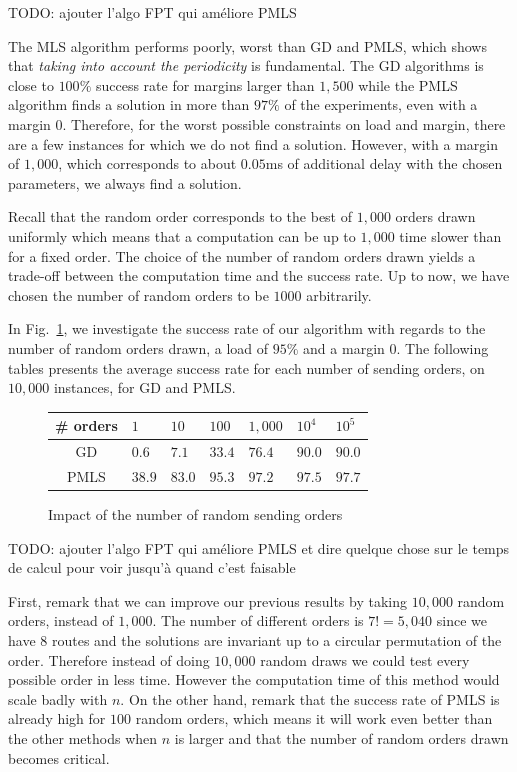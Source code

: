\documentclass[10pt, conference, letterpaper]{IEEEtran}
\newcommand{\todo}[1]{{\color{red} TODO: {#1}}}
\begin{document}
     \todo{ajouter l'algo FPT qui améliore PMLS}

     The MLS algorithm performs poorly, worst than GD and PMLS, which shows that \emph{taking into account the periodicity} is fundamental.
     The GD algorithms is close to $100\%$ success rate for margins larger than $1,500$ while the PMLS algorithm finds a solution in more than $97\%$ of the experiments, even with a margin $0$. Therefore, for the worst possible constraints on load and margin, there are a few instances for which we do not find a solution. However, with a margin of $1,000$, which corresponds to about $0.05$ms of additional delay with the chosen parameters, we always find a solution. 
     
    Recall that the random order corresponds to the best of $1,000$ orders drawn uniformly which means that a computation can be up to $1,000$ time slower than for a fixed order. The choice of the number of random orders drawn yields a trade-off between the computation time and the success rate. Up to now, we have chosen the number of random orders to be $1000$ arbitrarily.
    
    In Fig.~\ref{fig:randomdrawing}, we investigate the success rate of our algorithm with regards to the number of random orders drawn, a load of $95\%$ and a margin $0$. The following tables presents the average success rate for each number of sending orders, on $10,000$ instances, for GD and PMLS.
         \begin{figure}[h] 
       \begin{center}
   \begin{tabularx}{0.5\textwidth}{|c|X|X|X|X|X|X|}
    \hline
    \# orders& $1$ & $10$ & $100$& $1,000$& $10^{4}$&$10^{5}$\\
    \hline
    GD & $0.6$ &$7.1$&$33.4$&$76.4$&$90.0$&$90.0$\\
    \hline
  PMLS & $38.9$ &$83.0$&$95.3$&$97.2$&$97.5$&$97.7$\\
    \hline
      \end{tabularx}
      \end{center}
   \caption{Impact of the number of random sending orders}
        \label{fig:randomdrawing}
     \end{figure}
     \todo{ajouter l'algo FPT qui améliore PMLS et dire quelque chose sur le temps de calcul pour voir jusqu'à quand c'est faisable}
     
     
First, remark that we can improve our previous results by taking $10,000$ random orders,
instead of $1,000$. The number of different orders is $7!= 5,040$ since we have $8$ routes and the solutions are invariant up to a circular permutation of the order. Therefore instead of doing $10,000$ random draws we could test every possible order in less time. However the computation time of this method would scale badly with $n$. On the other hand, remark that the success rate of PMLS is already high for $100$ random orders, which means it will work even better than the other methods when $n$ is larger and that the number of random orders drawn becomes critical.
     
\end{document}
